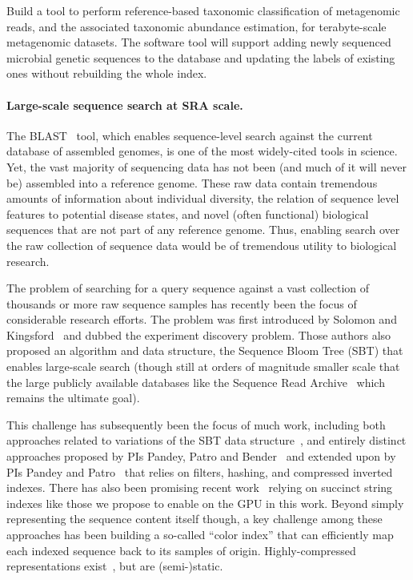 \begin{rproblem}%
Build a tool to perform reference-based taxonomic classification of metagenomic reads, and the associated taxonomic abundance estimation, for terabyte-scale metagenomic datasets. The software tool will support adding newly sequenced microbial genetic sequences to the database and updating the labels of existing ones without rebuilding the whole index.
\label{rprob:taxo-meta}
\end{rproblem}


\paragraph{Large-scale sequence search at SRA scale.} The BLAST~\cite{altschul1990basic} tool, which enables sequence-level search against the current database of assembled genomes, is one of the most widely-cited tools in science.  Yet, the vast majority of sequencing data has not been (and much of it will never be) assembled into a reference genome.  These raw data contain tremendous amounts of information about individual diversity, the relation of sequence level features to potential disease states, and novel (often functional) biological sequences that are not part of any reference genome.  Thus, enabling search over the raw collection of sequence data would be of tremendous utility to biological research.

The problem of searching for a query sequence against a vast collection of thousands or more raw sequence samples has recently been the focus of considerable research efforts.  The problem was first introduced by Solomon and Kingsford~\cite{solomon2016fast} and dubbed the experiment discovery problem. Those authors also proposed an algorithm and data structure, the Sequence Bloom Tree (SBT) that enables large-scale search (though still at orders of magnitude smaller scale that the large publicly available databases like the Sequence Read Archive~\cite{SRA} which remains the ultimate goal).

This challenge has subsequently been the focus of much work, including both approaches related to variations of the SBT data structure~\cite{SolomonK17,HarrisM20,BingmannBGI19}, and entirely distinct approaches proposed by PIs Pandey, Patro and Bender~\cite{PandeyAlBe18} and extended upon by PIs Pandey and Patro~\cite{AlmodaresiPFJP20} that relies on filters, hashing, and compressed inverted indexes.  There has also been promising recent work~\cite{Karasikov2020} relying on succinct string indexes like those we propose to enable on the GPU in this work.  Beyond simply representing the sequence content itself though, a key challenge among these approaches has been building a so-called ``color index'' that can efficiently map each indexed sequence back to its samples of origin. Highly-compressed representations exist~\cite{Karasikov2020,Pibiri2023MacDBG,AlmodaresiPFJP20}, but are (semi-)static. 

